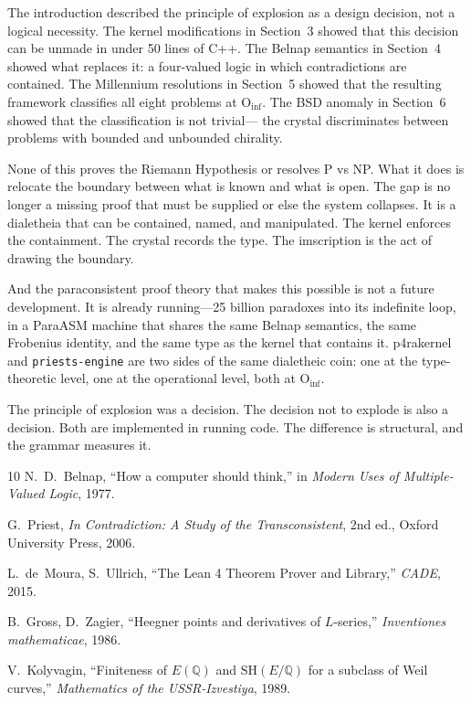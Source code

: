 \documentclass[11pt,a4paper]{article}
\theoremstyle{definition}
\begin{document}
The introduction described the principle of explosion as a design decision, not
a logical necessity. The kernel modifications in Section~3 showed that this
decision can be unmade in under 50 lines of C++. The Belnap semantics in
Section~4 showed what replaces it: a four-valued logic in which contradictions
are contained. The Millennium resolutions in Section~5 showed that the
resulting framework classifies all eight problems at $\text{O}_{\text{inf}}$.
The BSD anomaly in Section~6 showed that the classification is not trivial---
the crystal discriminates between problems with bounded and unbounded chirality.

None of this proves the Riemann Hypothesis or resolves P vs NP. What it does
is relocate the boundary between what is known and what is open. The gap is no
longer a missing proof that must be supplied or else the system collapses. It
is a dialetheia that can be contained, named, and manipulated. The kernel
enforces the containment. The crystal records the type. The imscription is the
act of drawing the boundary.

And the paraconsistent proof theory that makes this possible is not a future
development. It is already running---25 billion paradoxes into its indefinite
loop, in a ParaASM machine that shares the same Belnap semantics, the same
Frobenius identity, and the same type as the kernel that contains it.
p4rakernel and {\tt priests-engine} are two sides of the same dialetheic coin:
one at the type-theoretic level, one at the operational level, both at
$\text{O}_{\text{inf}}$.

The principle of explosion was a decision. The decision not to explode is also
a decision. Both are implemented in running code. The difference is structural,
and the grammar measures it.

\begin{thebibliography}{10}
N.~D.~Belnap, ``How a computer should think,'' in {\it Modern Uses of
  Multiple-Valued Logic}, 1977.

G.~Priest, {\it In Contradiction: A Study of the Transconsistent}, 2nd ed.,
Oxford University Press, 2006.

L.~de~Moura, S.~Ullrich, ``The Lean 4 Theorem Prover and Library,''
{\it CADE}, 2015.

B.~Gross, D.~Zagier, ``Heegner points and derivatives of $L$-series,''
{\it Inventiones mathematicae}, 1986.

V.~Kolyvagin, ``Finiteness of $E(\mathbb{Q})$ and
$\text{SH}(E/\mathbb{Q})$ for a subclass of Weil curves,''
{\it Mathematics of the USSR-Izvestiya}, 1989.
\end{thebibliography}
\end{document}

